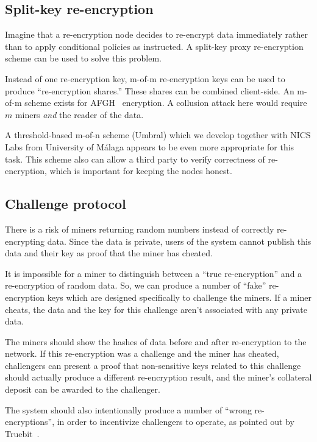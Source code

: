 \documentclass[longbibliography,nofootinbib]{revtex4-1}
\begin{document}
\begin{CJK*}{UTF8}{gbsn}
\subsection{Split-key re-encryption}
\label{sec:split-key}

Imagine that a re-encryption node decides to re-encrypt data immediately rather than to apply conditional policies as instructed.
A split-key proxy re-encryption scheme can be used to solve this problem.

Instead of one re-encryption key, m-of-m re-encryption keys can be used to produce ``re-encryption shares.''
These shares can be combined client-side.
An m-of-m scheme exists for AFGH~\cite{AFGH} encryption.
A collusion attack here would require $m$ miners \emph{and} the reader of the data.

A threshold-based m-of-n scheme (Umbral) which we develop together with NICS Labs from University of M{\'a}laga appears to be even more appropriate for this task.
This scheme also can allow a third party to verify correctness of re-encryption, which is important for keeping the nodes honest.

\subsection{Challenge protocol}
\label{sec:challenge-protocol}

There is a risk of miners returning random numbers instead of correctly re-encrypting data.
Since the data is private, users of the system cannot publish this data and their key as proof that the miner has cheated.

It is impossible for a miner to distinguish between a ``true re-encryption'' and a re-encryption of random data.
So, we can produce a number of ``fake'' re-encryption keys which are designed specifically to challenge the miners.
If a miner cheats, the data and the key for this challenge aren't associated with any private data.

The miners should show the hashes of data before and after re-encryption to the network.
If this re-encryption was a challenge and the miner has cheated, challengers can present a proof that non-sensitive keys related to this challenge should actually
produce a different re-encryption result, and the miner's collateral deposit can be awarded to the challenger.

The system should also intentionally produce a number of ``wrong re-encryptions'', in order to incentivize challengers to operate, as pointed out by
Truebit~\cite{truebit}.


\end{CJK*}
\end{document}
